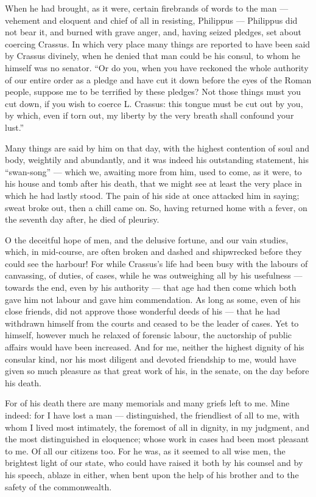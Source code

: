  When he had brought, as it were, certain firebrands of words to the man — vehement and eloquent and chief of all in resisting, Philippus — Philippus did not bear it, and burned with grave anger, and, having seized pledges, set about coercing Crassus. In which very place many things are reported to have been said by Crassus divinely, when he denied that man could be his consul, to whom he himself was no senator. ``Or do you, when you have reckoned the whole authority of our entire order as a pledge and have cut it down before the eyes of the Roman people, suppose me to be terrified by these pledges? Not those things must you cut down, if you wish to coerce L. Crassus: this tongue must be cut out by you, by which, even if torn out, my liberty by the very breath shall confound your lust.''

 Many things are said by him on that day, with the highest contention of soul and body, weightily and abundantly, and it was indeed his outstanding statement, his ``swan-song'' — which we, awaiting more from him, used to come, as it were, to his house and tomb after his death, that we might see at least the very place in which he had lastly stood. The pain of his side at once attacked him in saying; sweat broke out, then a chill came on. So, having returned home with a fever, on the seventh day after, he died of pleurisy.

 O the deceitful hope of men, and the delusive fortune, and our vain studies, which, in mid-course, are often broken and dashed and shipwrecked before they could see the harbour! For while Crassus's life had been busy with the labours of canvassing, of duties, of cases, while he was outweighing all by his usefulness — towards the end, even by his authority — that age had then come which both gave him not labour and gave him commendation. As long as some, even of his close friends, did not approve those wonderful deeds of his — that he had withdrawn himself from the courts and ceased to be the leader of cases. Yet to himself, however much he relaxed of forensic labour, the auctorship of public affairs would have been increased. And for me, neither the highest dignity of his consular kind, nor his most diligent and devoted friendship to me, would have given so much pleasure as that great work of his, in the senate, on the day before his death.

 For of his death there are many memorials and many griefs left to me. Mine indeed: for I have lost a man — distinguished, the friendliest of all to me, with whom I lived most intimately, the foremost of all in dignity, in my judgment, and the most distinguished in eloquence; whose work in cases had been most pleasant to me. Of all our citizens too. For he was, as it seemed to all wise men, the brightest light of our state, who could have raised it both by his counsel and by his speech, ablaze in either, when bent upon the help of his brother and to the safety of the commonwealth.

